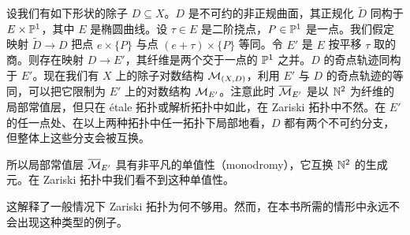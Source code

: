 \begin{example}
设我们有如下形状的除子 $D\subseteq X$。$D$ 是不可约的非正规曲面，其正规化 $\tilde D$ 同构于 $E\times\mathbb{P}^1$，其中 $E$ 是椭圆曲线。设 $\tau\in E$ 是二阶挠点，$P\in\mathbb{P}^1$ 是一点。我们假定映射 $\tilde D\to D$ 把点 $e\times\{P\}$ 与点 $(e+\tau)\times\{P\}$ 等同。令 $E'$ 是 $E$ 按平移 $\tau$ 取的商。则存在映射 $D\to E'$，其纤维是两个交于一点的 $\mathbb{P}^1$ 之并。$D$ 的奇点轨迹同构于 $E'$。现在我们有 $X$ 上的除子对数结构 $\mathcal{M}_{(X,D)}$，利用 $E'$ 与 $D$ 的奇点轨迹的等同，可以把它限制为 $E'$ 上的对数结构 $\mathcal{M}_{E'}$。注意此时 $\overline{\mathcal{M}}_{E'}$ 是以 $\mathbb{N}^2$ 为纤维的局部常值层，但只在 étale 拓扑或解析拓扑中如此，在 Zariski 拓扑中不然。在 $E'$ 的任一点处、在以上两种拓扑中任一拓扑下局部地看，$D$ 都有两个不可约分支，但整体上这些分支会被互换。
\end{example}

所以局部常值层 $\overline{\mathcal{M}}_{E'}$ 具有非平凡的单值性（monodromy），它互换 $\mathbb{N}^2$ 的生成元。在 Zariski 拓扑中我们看不到这种单值性。

这解释了一般情况下 Zariski 拓扑为何不够用。然而，在本书所需的情形中永远不会出现这种类型的例子。


